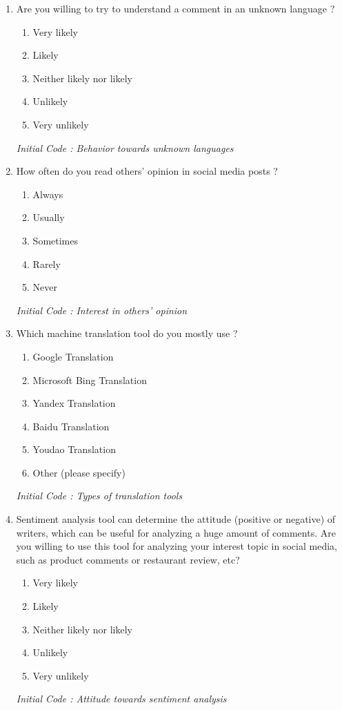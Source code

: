 \documentclass[conference]{IEEEtran}
\begin{document}
\begin{enumerate}
    \item Are you willing to try to understand a comment in an unknown language ?
    \begin{enumerate}
        \item Very likely
        \item Likely
        \item Neither likely nor likely
        \item Unlikely
        \item Very unlikely
    \end{enumerate}
    \textit{Initial Code : Behavior towards unknown languages}
       \item How often do you read others' opinion in social media posts ?
    \begin{enumerate}
        \item Always
        \item Usually
        \item Sometimes
        \item Rarely
        \item Never
    \end{enumerate}
    \textit{Initial Code : Interest in others' opinion}

    \item Which machine translation tool do you mostly use ?
    \begin{enumerate}
        \item Google Translation
        \item Microsoft Bing Translation
        \item Yandex Translation
        \item Baidu Translation
        \item Youdao Translation
        \item Other (please specify)
    \end{enumerate}
    \textit{Initial Code : Types of translation tools}

    \item Sentiment analysis tool can determine the attitude (positive or negative) of writers, which can be useful for analyzing a huge amount of comments. Are you willing to use this tool for analyzing your interest topic in social media, such as product comments or restaurant review, etc?
    \begin{enumerate}
        \item Very likely
        \item Likely
        \item Neither likely nor likely
        \item Unlikely
        \item Very unlikely
    \end{enumerate}
    \textit{Initial Code : Attitude towards sentiment analysis}

\end{enumerate}



\end{document}
